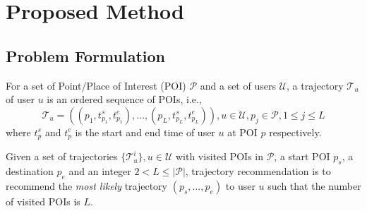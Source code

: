 \section{Proposed Method}
\label{method}


\subsection{Problem Formulation}
\label{method:formulation}
For a set of Point/Place of Interest (POI) $\mathcal{P}$ and a set of users $\mathcal{U}$,
a trajectory $\mathcal{T}_u$ of user $u$ is an ordered sequence of POIs,
i.e.,
\begin{displaymath}
    \mathcal{T}_u = ((p_1, t_{p_1}^s, t_{p_{1}}^e), \dots, (p_L, t_{p_L}^s, t_{p_L}^e)), 
    u \in \mathcal{U}, 
    p_j \in \mathcal{P}, 1 \le j \le L
\end{displaymath}
where $t_p^s$ and $t_p^e$ is the start and end time of user $u$ at POI $p$ respectively.

Given a set of trajectories $\{ \mathcal{T}_u^i \}, u \in \mathcal{U}$ with visited POIs in $\mathcal{P}$, 
a start POI $p_s$, a destination $p_e$ and an integer $2 < L \le |\mathcal{P}|$,
trajectory recommendation is to recommend the \textit{most likely} trajectory $(p_s, \dots, p_e)$ to user $u$ such that
the number of visited POIs is $L$.


